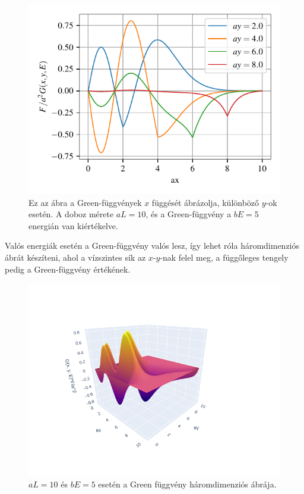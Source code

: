 \begin{figure}[H]
	\centering
	\includegraphics[scale=1]{./figs/1dgreens.pdf}
	\caption[Egydimenziós Green-függvény]{Ez az ábra a Green-függvények $x$ függését ábrázolja, különböző $y$-ok esetén. A doboz mérete $aL=10$, és a Green-függvény a $bE=5$ energián van kiértékelve.}
	\label{egzakt:1dgreens}
\end{figure}
Valós energiák esetén a Green-függvény valós lesz, így lehet róla háromdimenziós ábrát készíteni, ahol a vízszintes sík az $x$-$y$-nak felel meg, a függőleges tengely pedig a Green-függvény értékének.
\begin{figure}[H]
	\centering
	\includegraphics[scale=0.65]{./figs/2dgreen.png}
	\caption[Kétdimenziós Green-függvény]{$aL=10$ és $bE=5$ esetén a Green függvény háromdimenziós ábrája.}
	\label{egzakt:2dgreen}
\end{figure}

